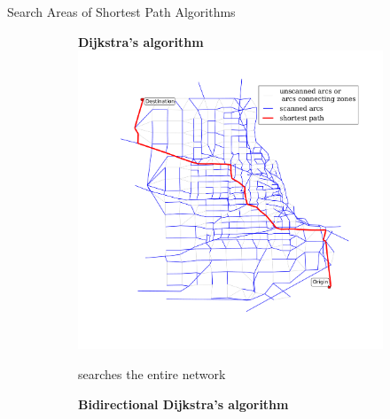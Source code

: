 \documentclass[final]{beamer}
\begin{document}
\begin{frame}{ }
\begin{columns}[t]
\begin{column}{.4\linewidth}
            \begin{block}{Search Areas of Shortest Path Algorithms}
                    \vspace{2em}
                \begin{figure}
                    \centering
                    \begin{subfigure}{.5\linewidth}
                        \centering
                        {\bfseries Dijkstra's algorithm }
                        \includegraphics[width=\linewidth,trim=120px 120px 48px 60px,clip]{img/dijkstra}
                        \caption{searches the entire network}
                    \vspace{2em}
                    \end{subfigure}%
                    \begin{subfigure}{.5\linewidth}
                        \centering
                        {\bfseries Bidirectional Dijkstra's algorithm}

\end{subfigure}
\end{figure}
\end{block}
\end{column}
\end{columns}
\end{frame}
\end{document}
